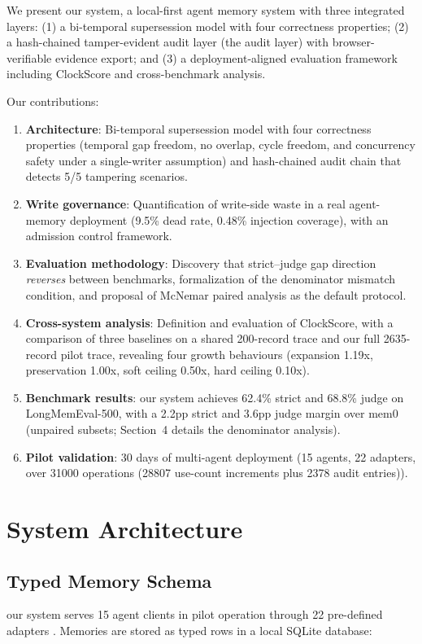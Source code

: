 \documentclass{llncs}
\begin{document}
We present our system, a local-first agent memory system with three integrated layers: (1) a bi-temporal supersession model with four correctness properties; (2) a hash-chained tamper-evident audit layer (the audit layer) with browser-verifiable evidence export; and (3) a deployment-aligned evaluation framework including ClockScore and cross-benchmark analysis.

Our contributions:
\begin{enumerate}
\item \textbf{Architecture}: Bi-temporal supersession model with four correctness properties (temporal gap freedom, no overlap, cycle freedom, and concurrency safety under a single-writer assumption) and hash-chained audit chain that detects 5/5 tampering scenarios.
\item \textbf{Write governance}: Quantification of write-side waste in a real agent-memory deployment (9.5\% dead rate, 0.48\% injection coverage), with an admission control framework.
\item \textbf{Evaluation methodology}: Discovery that strict--judge gap direction \emph{reverses} between benchmarks, formalization of the denominator mismatch condition, and proposal of McNemar paired analysis as the default protocol.
\item \textbf{Cross-system analysis}: Definition and evaluation of ClockScore, with a comparison of three baselines on a shared 200-record trace and our full 2{}635-record pilot trace, revealing four growth behaviours (expansion 1.19x, preservation 1.00x, soft ceiling 0.50x, hard ceiling 0.10x).
\item \textbf{Benchmark results}: our system achieves 62.4\% strict and 68.8\% judge on LongMemEval-500, with a 2.2pp strict and 3.6pp judge margin over mem0 (unpaired subsets; Section~4 details the denominator analysis).
\item \textbf{Pilot validation}: 30 days of multi-agent deployment (15 agents, 22 adapters, over 31{}000 operations (28{}807 use-count increments plus 2{}378 audit entries)).
\end{enumerate}

\section{System Architecture}


\subsection{Typed Memory Schema}
our system serves 15 agent clients in pilot operation through 22 pre-defined adapters . Memories are stored as typed rows in a local SQLite database:
\end{document}
